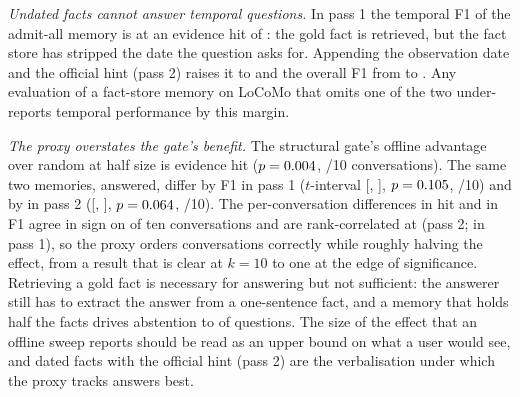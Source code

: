 \documentclass{ceurart}
\begin{document}
\emph{Undated facts cannot answer temporal questions.} In pass 1 the temporal F1 of the admit-all memory is \foneOneAdmitAllTemporal{} at an evidence hit of \hitOneAdmitAllTemporal: the gold fact is retrieved, but the fact store has stripped the date the question asks for. Appending the observation date and the official hint (pass 2) raises it to \foneTwoAdmitAllTemporal{} and the overall F1 from \foneOneAdmitAll{} to \foneTwoAdmitAll. Any evaluation of a fact-store memory on LoCoMo that omits one of the two under-reports temporal performance by this margin.

\emph{The proxy overstates the gate's benefit.} The structural gate's offline advantage over random at half size is \permRandomMean{} evidence hit ($p=0.004$, \permRandomWins/10 conversations). The same two memories, answered, differ by \dFoneStructRandomOne{} F1 in pass 1 ($t$-interval [\ciFoneStructRandomLoOne, \ciFoneStructRandomHiOne], $p=0.105$, \winsFoneStructRandomOne/10) and by \dFoneStructRandomTwo{} in pass 2 ([\ciFoneStructRandomLoTwo, \ciFoneStructRandomHiTwo], $p=0.064$, \winsFoneStructRandomTwo/10). The per-conversation differences in hit and in F1 agree in sign on \signAgreeTwo{} of ten conversations and are rank-correlated at \rhoDhitDfoneTwo{} (pass 2; \rhoDhitDfoneOne{} in pass 1), so the proxy orders conversations correctly while roughly halving the effect, from a result that is clear at $k=10$ to one at the edge of significance. Retrieving a gold fact is necessary for answering but not sufficient: the answerer still has to extract the answer from a one-sentence fact, and a memory that holds half the facts drives abstention to \abstTwoStruct{} of questions. The size of the effect that an offline sweep reports should be read as an upper bound on what a user would see, and dated facts with the official hint (pass 2) are the verbalisation under which the proxy tracks answers best.
\end{document}
